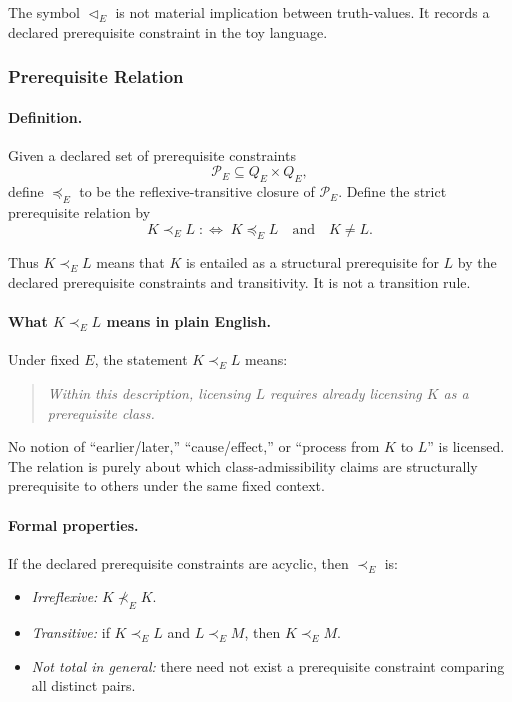 \documentclass[aps,prx,onecolumn,11pt]{revtex4-2}
\theoremstyle{plain}
\theoremstyle{definition}
\theoremstyle{remark}
\begin{document}
The symbol \(\triangleleft_E\) is not material implication between
truth-values. It records a declared prerequisite constraint in the toy
language.

\subsubsection{Prerequisite Relation}
\label{toy:nontotal_ordering:relation}

\paragraph{Definition.}

Given a declared set of prerequisite constraints
\[
\mathcal P_E\subseteq Q_E\times Q_E,
\]
define \(\preceq_E\) to be the reflexive-transitive closure of
\(\mathcal P_E\). Define the strict prerequisite relation by
\begin{equation}
K\prec_E L
\;:\Longleftrightarrow\;
K\preceq_E L
\quad\text{and}\quad
K\neq L.
\label{eq:toy_prereq_relation}
\end{equation}

Thus \(K\prec_E L\) means that \(K\) is entailed as a structural
prerequisite for \(L\) by the declared prerequisite constraints and
transitivity. It is not a transition rule.

\paragraph{What \(K\prec_E L\) means in plain English.}

Under fixed \(E\), the statement \(K\prec_E L\) means:
\begin{quote}
\emph{Within this description, licensing \(L\) requires already
licensing \(K\) as a prerequisite class.}
\end{quote}

No notion of ``earlier/later,'' ``cause/effect,'' or ``process from
\(K\) to \(L\)'' is licensed. The relation is purely about which
class-admissibility claims are structurally prerequisite to others under
the same fixed context.

\paragraph{Formal properties.}

If the declared prerequisite constraints are acyclic, then
\(\prec_E\) is:

\begin{itemize}
\item \emph{Irreflexive:} \(K\not\prec_E K\).
\item \emph{Transitive:} if \(K\prec_E L\) and \(L\prec_E M\), then
\(K\prec_E M\).
\item \emph{Not total in general:} there need not exist a prerequisite
constraint comparing all distinct pairs.
\end{itemize}
\end{document}
